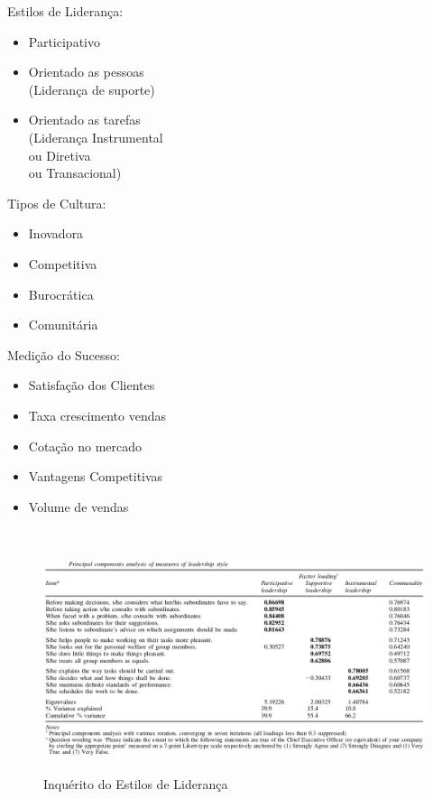 \begin{minipage}[t]{.31\linewidth}
	\quad Estilos de Liderança:
	\begin{itemize}
		\setlength\itemsep{-0.3em}
		\item Participativo
		\item Orientado as pessoas\\
		(Liderança de suporte)
		\item Orientado as tarefas\\
		(Liderança Instrumental\\ ou Diretiva\\ ou Transacional)
	\end{itemize}
\end{minipage}
\begin{minipage}[t]{.31\linewidth}
	\quad Tipos de Cultura:
	\begin{itemize}
		\setlength\itemsep{-0.3em}
		\item Inovadora
		\item Competitiva
		\item Burocrática
		\item Comunitária
	\end{itemize}
\end{minipage}
\begin{minipage}[t]{.31\linewidth}
	\quad Medição do Sucesso:
	\begin{itemize}
		\setlength\itemsep{-0.3em}
		\item Satisfação dos Clientes
		\item Taxa crescimento vendas
		\item Cotação no mercado
		\item Vantagens Competitivas
		\item Volume de vendas
	\end{itemize}
\end{minipage}
\vspace{1cm}\\
\begin{figure}[H]
	\centering
	\includegraphics[scale=.5]{./image/CORGA/OB/Leadership.jpg}\\
	\caption{Inquérito do Estilos de Liderança \cite{article_1}}
\end{figure}\par
